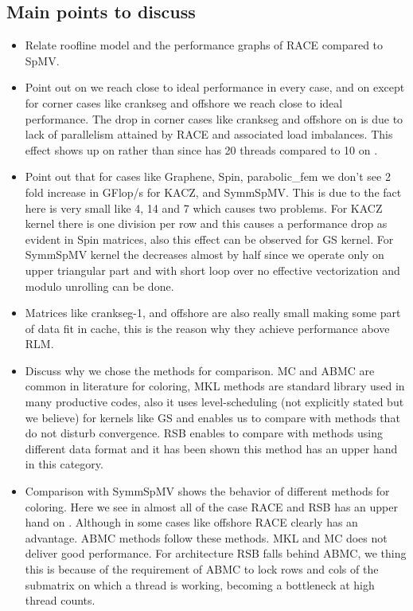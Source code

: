 \subsection{Main points to discuss}
\begin{itemize}
	\item Relate roofline model and the performance graphs of RACE compared to SpMV. 
	\item Point out on \IVB we reach close to ideal performance in every case, and on \SKX except for corner cases like crankseg and offshore we reach close to ideal performance. The drop in corner cases like crankseg and offshore on \SKX is due to lack of parallelism attained by RACE and associated load imbalances. This effect shows up on \SKX rather than \IVB since \SKX has 20 threads compared to 10 on \IVB.
	\item Point out that for cases like Graphene, Spin, parabolic\_fem we don't see 2 fold increase in GFlop/s for KACZ, and SymmSpMV. This is due to the fact here \NNZR is very small like 4, 14 and 7 which causes two problems. For KACZ kernel there is one division per row and this causes a performance drop as evident in Spin matrices, also this effect can be observed for GS kernel. For SymmSpMV kernel the \NNZR decreases almost by half since we operate only on upper triangular part and with short loop over \NNZR no effective vectorization and modulo unrolling can be done.
	\item Matrices like crankseg-1, and offshore are also really small making some part of data fit in cache, this is the reason why they achieve performance above RLM.
	\item Discuss why we chose the methods for comparison. MC and ABMC are common in literature for \DONE coloring, MKL methods are standard library used in many productive codes, also it uses level-scheduling (not explicitly stated but we believe) for kernels like GS and enables us to compare with methods that do not disturb convergence. RSB enables to compare with methods using different data format and it has been shown this method has an upper hand in this category. 
	\item Comparison with SymmSpMV shows the behavior of different methods for \DTWO coloring. Here we see in almost all of the case RACE and RSB has an upper hand on \IVB. Although in some cases like offshore RACE clearly has an advantage. ABMC methods follow these methods. MKL and MC does not deliver good performance. For \SKX architecture RSB falls behind ABMC, we thing this is because of the requirement of ABMC to lock rows and cols of the submatrix on which a thread is working, becoming a bottleneck at high thread counts.

\end{itemize}
